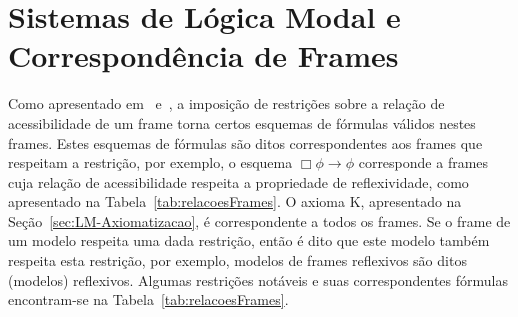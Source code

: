     \section{Sistemas de Lógica Modal e Correspondência de Frames}
        \label{sec:LM-Correspondencia}

        Como apresentado em~ e~, a imposição de restrições sobre a relação de acessibilidade
        de um frame torna certos esquemas de fórmulas válidos nestes frames. Estes esquemas de fórmulas são ditos correspondentes
        aos frames que respeitam a restrição, por exemplo, o esquema \(\Box \phi \to \phi\) corresponde a frames cuja relação de acessibilidade
        respeita a propriedade de reflexividade, como apresentado na Tabela~\ref{tab:relacoesFrames}. O axioma \textrm{K}, apresentado
        na Seção~\ref{sec:LM-Axiomatizacao}, é correspondente a todos os frames. Se o frame de um modelo respeita uma dada restrição, então
        é dito que este modelo também respeita esta restrição, por exemplo, modelos de frames reflexivos são ditos (modelos) reflexivos.
        Algumas restrições notáveis e suas correspondentes fórmulas encontram-se na Tabela~\ref{tab:relacoesFrames}.
